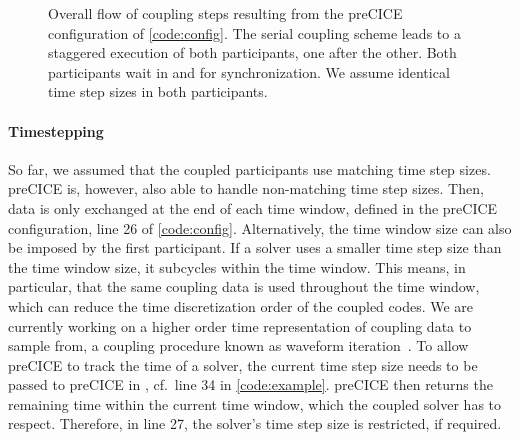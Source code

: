 \begin{figure}[h!]
\caption{
\label{fig:schedule}
Overall flow of coupling steps resulting from the preCICE configuration of \autoref{code:config}.
The serial coupling scheme leads to a staggered execution of both participants, one after the other. Both participants wait in  and  for synchronization. We assume identical time step sizes in both participants.
}
\end{figure}
  
\paragraph{Timestepping} So far, we assumed  that the coupled participants use matching time step sizes. preCICE is, however, also able to handle non-matching time step sizes. 
Then, data is only exchanged at the end of each time window, defined in the preCICE configuration, line 26 of \autoref{code:config}. Alternatively, the time window size can also be imposed by the first participant.
If a solver uses a smaller time step size than the time window size, it subcycles within the time window. This means, in particular, that the same coupling data is used throughout the time window, which can reduce the time discretization order of the coupled codes. We are currently working on a higher order time representation of coupling data to sample from, a coupling procedure known as waveform iteration~\cite{QNWI}.
To allow preCICE to track the time of a solver, the current time step size needs to be passed to preCICE in , cf.~line 34 in \autoref{code:example}. preCICE then returns the remaining time within the current time window, which the coupled solver has to respect. Therefore, in line 27, the solver's time step size is restricted, if required. 



